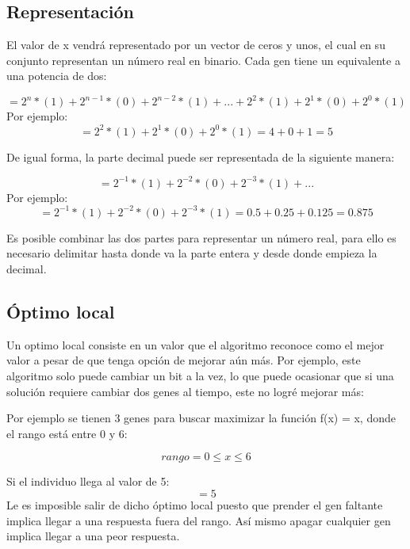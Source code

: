 \documentclass[10pt]{report}
\begin{document}
\subsection*{Representación}
El valor de x vendrá representado por un vector de ceros y unos, el cual en su conjunto representan un número real en binario. Cada gen tiene un equivalente a una potencia de dos:

\begin{equation*}
    [1,0,1,...,1,0,1] = 2^{n}*(1)+2^{n-1}*(0)+2^{n-2}*(1)+...+2^{2}*(1)+2^{1}*(0)+2^{0}*(1)
\end{equation*}
Por ejemplo:
\begin{equation*}
    [1,0,1] = 2^{2}*(1)+2^{1}*(0)+2^{0}*(1) = 4+0+1 = 5
\end{equation*}

De igual forma, la parte decimal puede ser representada de la siguiente manera:

\begin{equation*}
    [1,0,1,...] = 2^{-1}*(1)+2^{-2}*(0)+2^{-3}*(1)+...
\end{equation*}
Por ejemplo:
\begin{equation*}
    [1,0,1] = 2^{-1}*(1)+2^{-2}*(0)+2^{-3}*(1) = 0.5+0.25+0.125 = 0.875
\end{equation*}

Es posible combinar las dos partes para representar un número real, para ello es necesario delimitar hasta donde va la parte entera y desde donde empieza la decimal.

\subsection*{Óptimo local}

Un optimo local consiste en un valor que el algoritmo reconoce como el mejor valor a pesar de que tenga opción de mejorar aún más. Por ejemplo, este algoritmo solo puede cambiar un bit a la vez, lo que puede ocasionar que si una solución requiere cambiar dos genes al tiempo, este no logré mejorar más:

Por ejemplo se tienen 3 genes para buscar maximizar la función f(x) = x, donde el rango está entre 0 y 6:

\begin{equation*}
    rango = 0\leq x \leq 6
\end{equation*}

Si el individuo llega al valor de 5:
\begin{equation*}
    [1,0,1] = 5
\end{equation*}
Le es imposible salir de dicho óptimo local puesto que prender el gen faltante implica llegar a una respuesta fuera del rango. Así mismo apagar cualquier gen implica llegar a una peor respuesta.
\end{document}
